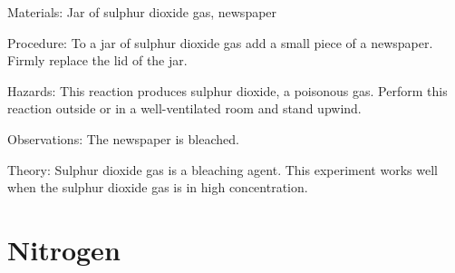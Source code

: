\begin{multicols}{2}
\begin{description*}
\item[Materials:]{Jar of sulphur dioxide gas, newspaper}
\item[Procedure:]{To a jar of sulphur dioxide gas add a small
piece of a newspaper. Firmly replace the lid of
the jar.}
\item[Hazards:]{This reaction produces sulphur dioxide, a poisonous gas. Perform this
reaction outside or in a well-ventilated room and stand upwind.}
\item[Observations:]{The newspaper is bleached.}
\item[Theory:]{Sulphur dioxide gas is a bleaching agent.
This experiment works well when the sulphur
dioxide gas is in high concentration.}
\end{description*}

\columnbreak

%
%


\section*{Nitrogen}



\end{multicols}
